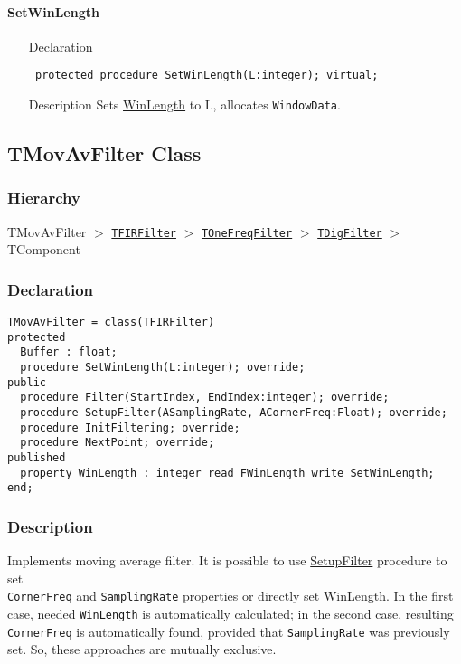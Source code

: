 \documentclass[12pt,a4paper,oneside]{report}
\newcommand{\declarationitem}[1]{{\addfontfeatures{FakeSlant} #1}}
\newcommand{\descriptiontitle}[1]{{\addfontfeatures{FakeSlant}#1}}
\newcommand{\code}[1]{\texttt{#1}}
\begin{document}
\paragraph{SetWinLength}\hspace*{\fill}
\label{lmfilters.TFIRFilter-SetWinLength}
\begin{itemize}\item[\declarationitem{Declaration}\hfill]
	\begin{flushleft}
		\code{
			protected procedure SetWinLength(L:integer); virtual;}
	\end{flushleft}
\item[\descriptiontitle{Description}] Sets \hyperref[lmfilters.TFIRFilter-WinLength]{WinLength} to L, allocates \code{WindowData}.
\end{itemize}
\subsection{TMovAvFilter Class}
\label{lmfilters.TMovAvFilter}
\subsubsection{Hierarchy}
TMovAvFilter {$>$} \hyperref[lmfilters.TFIRFilter]{\code{TFIRFilter}} {$>$} \hyperref[lmfilters.TOneFreqFilter]{\code{TOneFreqFilter}} {$>$} \hyperref[lmfilters.TDigFilter]{\code{TDigFilter}} {$>$} 
TComponent
\subsubsection{Declaration}
\begin{verbatim}
TMovAvFilter = class(TFIRFilter)
protected
  Buffer : float;
  procedure SetWinLength(L:integer); override;
public
  procedure Filter(StartIndex, EndIndex:integer); override;
  procedure SetupFilter(ASamplingRate, ACornerFreq:Float); override;
  procedure InitFiltering; override;
  procedure NextPoint; override;
published
  property WinLength : integer read FWinLength write SetWinLength;
end;
\end{verbatim}
\subsubsection{Description}
Implements moving average filter. It is possible to use \hyperref[lmfilters.TMovAvFilter-SetupFilter]{SetupFilter} procedure to set \\ \hyperref[lmfilters.TOneFreqFilter-Cutfreq1]{\code{CornerFreq}}  and \hyperref[lmfilters.TOneFreqFilter-SamplingRate]{\code{SamplingRate}} properties or directly set \hyperref[lmfilters.TFIRFilter-WinLength]{WinLength}. In the first case, needed \code{WinLength}{} is automatically calculated; in the second case, resulting \code{CornerFreq} is automatically found, provided that \code{SamplingRate} was previously set. So, these approaches are mutually exclusive. 
\end{document}
